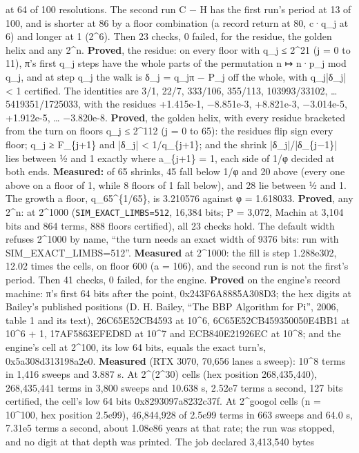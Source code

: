 \begin{description}
at 64 of 100 resolutions. The second run C − H has the first run's period at 13 of 100, and is shorter at 86 by a floor combination (a record return at 80, c·q\_\allowbreak{}j at 6) and longer at 1 (2\textasciicircum{}6). Then 23 checks, 0 failed, for the residue, the golden helix and any 2\textasciicircum{}n. \textbf{Proved}, the residue: on every floor with q\_\allowbreak{}j ≤ 2\textasciicircum{}21 (j = 0 to 11), π's first q\_\allowbreak{}j steps have the whole parts of the permutation n ↦ n·p\_\allowbreak{}j mod q\_\allowbreak{}j, and at step q\_\allowbreak{}j the walk is δ\_\allowbreak{}j = q\_\allowbreak{}jπ − P\_\allowbreak{}j off the whole, with q\_\allowbreak{}j|δ\_\allowbreak{}j| < 1 certified. The identities are 3/1, 22/7, 333/106, 355/113, 103993/33102, … 5419351/1725033, with the residues +1.415e-1, −8.851e-3, +8.821e-3, −3.014e-5, +1.912e-5, … −3.820e-8. \textbf{Proved}, the golden helix, with every residue bracketed from the turn on floors q\_\allowbreak{}j ≤ 2\textasciicircum{}112 (j = 0 to 65): the residues flip sign every floor; q\_\allowbreak{}j ≥ F\_\allowbreak{}\{j+1\} and |δ\_\allowbreak{}j| < 1/q\_\allowbreak{}\{j+1\}; and the shrink |δ\_\allowbreak{}j|/|δ\_\allowbreak{}\{j−1\}| lies between ½ and 1 exactly where a\_\allowbreak{}\{j+1\} = 1, each side of 1/φ decided at both ends. \textbf{Measured:} of 65 shrinks, 45 fall below 1/φ and 20 above (every one above on a floor of 1, while 8 floors of 1 fall below), and 28 lie between ½ and 1. The growth a floor, q\_\allowbreak{}65\textasciicircum{}\{1/65\}, is 3.210576 against φ = 1.618033. \textbf{Proved}, any 2\textasciicircum{}n: at 2\textasciicircum{}1000 (\texttt{SIM\_\allowbreak{}EXACT\_\allowbreak{}LIMBS=512}, 16,384 bits; P = 3,072, Machin at 3,104 bits and 864 terms, 888 floors certified), all 23 checks hold. The default width refuses 2\textasciicircum{}1000 by name, “the turn needs an exact width of 9376 bits: run with SIM\_\allowbreak{}EXACT\_\allowbreak{}LIMBS=512”. \textbf{Measured} at 2\textasciicircum{}1000: the fill is step 1.288e302, 12.02 times the cells, on floor 600 (a = 106), and the second run is not the first's period. Then 41 checks, 0 failed, for the engine. \textbf{Proved} on the engine's record machine: π's first 64 bits after the point, 0x243F6A8885A308D3; the hex digits at Bailey's published positions (D. H. Bailey, “The BBP Algorithm for Pi”, 2006, table 1 and its text), 26C65E52CB4593 at 10\textasciicircum{}6, 6C65E52CB459350050E4BB1 at 10\textasciicircum{}6 + 1, 17AF5863EFED8D at 10\textasciicircum{}7 and ECB840E21926EC at 10\textasciicircum{}8; and the engine's cell at 2\textasciicircum{}100, its low 64 bits, equals the exact turn's, 0x5a308d313198a2e0. \textbf{Measured} (RTX 3070, 70,656 lanes a sweep): 10\textasciicircum{}8 terms in 1,416 sweeps and 3.887 s. At 2\textasciicircum{}(2\textasciicircum{}30) cells (hex position 268,435,440), 268,435,441 terms in 3,800 sweeps and 10.638 s, 2.52e7 terms a second, 127 bits certified, the cell's low 64 bits 0x8293097a8232c37f. At 2\textasciicircum{}googol cells (n = 10\textasciicircum{}100, hex position 2.5e99), 46,844,928 of 2.5e99 terms in 663 sweeps and 64.0 s, 7.31e5 terms a second, about 1.08e86 years at that rate; the run was stopped, and no digit at that depth was printed. The job declared 3,413,540 bytes 
\end{description}
